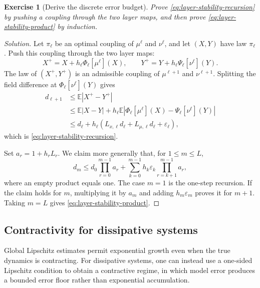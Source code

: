 \documentclass[11pt]{amsart}
\numberwithin{equation}{section}
\theoremstyle{plain}
\newtheorem{exercise}[theorem]{Exercise}
\newcommand{\E}{\mathbb{E}}
\newcommand{\abs}[1]{\left\lvert#1\right\rvert}
\begin{document}
\begin{exercise}[Derive the discrete error budget]\label{ex:layer-stability}
Prove \eqref{eq:layer-stability-recursion} by pushing a coupling through the two
layer maps, and then prove \eqref{eq:layer-stability-product} by induction.
\end{exercise}
\begin{proof}[Solution]
Let $\pi_\ell$ be an optimal coupling of $\mu^\ell$ and $\nu^\ell$, and let
$(X,Y)$ have law $\pi_\ell$.  Push this coupling through the two layer maps:
\[
 X^+=X+h_\ell\Phi_\ell[\mu^\ell](X),\qquad
 Y^+=Y+h_\ell\Psi_\ell[\nu^\ell](Y).
\]
The law of $(X^+,Y^+)$ is an admissible coupling of
$\mu^{\ell+1}$ and $\nu^{\ell+1}$.  Splitting the field difference at
$\Phi_\ell[\nu^\ell](Y)$ gives
\begin{align*}
 d_{\ell+1}
 &\leq\E\abs{X^+-Y^+}\\
 &\leq\E\abs{X-Y}
 +h_\ell\E\abs{
 \Phi_\ell[\mu^\ell](X)-\Psi_\ell[\nu^\ell](Y)}\\
 &\leq d_\ell+h_\ell\left(
 L_{x,\ell}d_\ell+L_{\mu,\ell}d_\ell
 +\varepsilon_\ell\right),
\end{align*}
which is \eqref{eq:layer-stability-recursion}.

Set $a_r=1+h_rL_r$.  We claim more generally that, for $1\leq m\leq L$,
\[
 d_m\leq d_0\prod_{r=0}^{m-1}a_r
 +\sum_{k=0}^{m-1}h_k\varepsilon_k
   \prod_{r=k+1}^{m-1}a_r,
\]
where an empty product equals one.  The case $m=1$ is the one-step recursion.
If the claim holds for $m$, multiplying it by $a_m$ and adding
$h_m\varepsilon_m$ proves it for $m+1$.  Taking $m=L$ gives
\eqref{eq:layer-stability-product}.
\end{proof}


\subsection{Contractivity for dissipative systems}
Global Lipschitz estimates permit exponential growth even when the true
dynamics is contracting.  For dissipative systems, one can instead use a one-sided Lipschitz condition to obtain a contractive regime, in which model error produces a bounded error floor rather
than exponential accumulation. 
\end{document}
